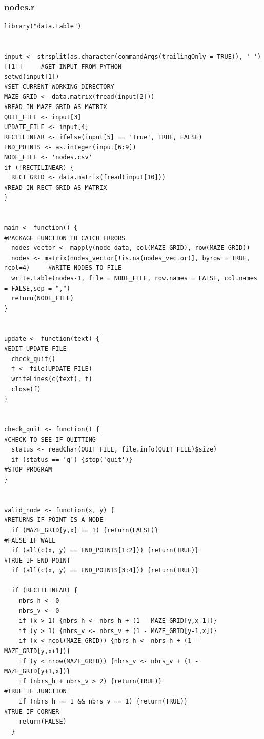 \documentclass[titlepage]{article}
\begin{document}
\pagebreak
\subsubsection{nodes.r}
\begin{changemargin}{-1in}{-1in} 
\begin{verbatim}
library("data.table")


input <- strsplit(as.character(commandArgs(trailingOnly = TRUE)), ' ')[[1]]     #GET INPUT FROM PYTHON
setwd(input[1])                                                                 #SET CURRENT WORKING DIRECTORY
MAZE_GRID <- data.matrix(fread(input[2]))                                       #READ IN MAZE GRID AS MATRIX
QUIT_FILE <- input[3]
UPDATE_FILE <- input[4]
RECTILINEAR <- ifelse(input[5] == 'True', TRUE, FALSE)
END_POINTS <- as.integer(input[6:9])
NODE_FILE <- 'nodes.csv'
if (!RECTILINEAR) {
  RECT_GRID <- data.matrix(fread(input[10]))                                    #READ IN RECT GRID AS MATRIX
}


main <- function() {                                                            #PACKAGE FUNCTION TO CATCH ERRORS
  nodes_vector <- mapply(node_data, col(MAZE_GRID), row(MAZE_GRID))
  nodes <- matrix(nodes_vector[!is.na(nodes_vector)], byrow = TRUE, ncol=4)     #WRITE NODES TO FILE
  write.table(nodes-1, file = NODE_FILE, row.names = FALSE, col.names = FALSE,sep = ",")
  return(NODE_FILE)
}


update <- function(text) {                                                      #EDIT UPDATE FILE
  check_quit()
  f <- file(UPDATE_FILE)
  writeLines(c(text), f)
  close(f)
}


check_quit <- function() {                                                      #CHECK TO SEE IF QUITTING
  status <- readChar(QUIT_FILE, file.info(QUIT_FILE)$size)
  if (status == 'q') {stop('quit')}                                             #STOP PROGRAM
}


valid_node <- function(x, y) {                                                  #RETURNS IF POINT IS A NODE
  if (MAZE_GRID[y,x] == 1) {return(FALSE)}                                      #FALSE IF WALL
  if (all(c(x, y) == END_POINTS[1:2])) {return(TRUE)}                           #TRUE IF END POINT
  if (all(c(x, y) == END_POINTS[3:4])) {return(TRUE)}

  if (RECTILINEAR) {
    nbrs_h <- 0
    nbrs_v <- 0
    if (x > 1) {nbrs_h <- nbrs_h + (1 - MAZE_GRID[y,x-1])}
    if (y > 1) {nbrs_v <- nbrs_v + (1 - MAZE_GRID[y-1,x])}
    if (x < ncol(MAZE_GRID)) {nbrs_h <- nbrs_h + (1 - MAZE_GRID[y,x+1])}
    if (y < nrow(MAZE_GRID)) {nbrs_v <- nbrs_v + (1 - MAZE_GRID[y+1,x])}
    if (nbrs_h + nbrs_v > 2) {return(TRUE)}                                     #TRUE IF JUNCTION
    if (nbrs_h == 1 && nbrs_v == 1) {return(TRUE)}                              #TRUE IF CORNER
    return(FALSE)
  }


\end{verbatim}
\end{changemargin}
\end{document}
